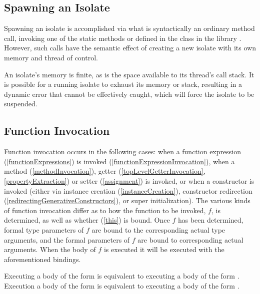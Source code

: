 \documentclass[makeidx]{article}
\begin{document}
{\subsection{Spawning an Isolate}

\LMHash{}%
Spawning an isolate is accomplished via what is syntactically
an ordinary method call,
invoking one of the static methods  or  defined in
the  class in the library .
However, such calls have the semantic effect of creating
a new isolate with its own memory and thread of control.

\LMHash{}%
An isolate's memory is finite, as is the space available to
its thread's call stack.
It is possible for a running isolate to exhaust its memory or stack,
resulting in a dynamic error that cannot be effectively caught,
which will force the isolate to be suspended.



\subsection{Function Invocation}

\LMHash{}%
Function invocation occurs in the following cases:
when a function expression (\ref{functionExpressions})
is invoked (\ref{functionExpressionInvocation}),
when a method (\ref{methodInvocation}),
getter (\ref{topLevelGetterInvocation}, \ref{propertyExtraction})
or setter (\ref{assignment})
is invoked,
or when a constructor is invoked
(either via instance creation (\ref{instanceCreation}),
constructor redirection (\ref{redirectingGenerativeConstructors}),
or super initialization).
The various kinds of function invocation differ as to
how the function to be invoked, $f$, is determined,
as well as whether \THIS{} (\ref{this}) is bound.
Once $f$ has been determined,
formal type parameters of $f$ are bound to
the corresponding actual type arguments,
and the formal parameters of $f$ are bound to corresponding actual arguments.
When the body of $f$ is executed it will be executed
with the aforementioned bindings.

\LMHash{}%
Executing a body of the form  is equivalent to executing
a body of the form .
Execution a body of the form  is equivalent to executing
a body of the form .

}
\end{document}
